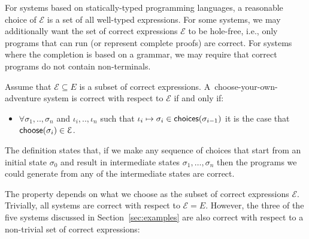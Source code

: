 \documentclass[ a4paper,UKenglish,cleveref, autoref, thm-restate]{lipics-v2021}
\newcommand{\ident}[1]{\textsf{#1}}
\newcommand{\select}{\textnormal{\ident{choose}}}
\newcommand{\choices}{\textnormal{\ident{choices}}}
\begin{document}
For systems based on statically-typed programming languages, a reasonable choice of $\mathcal{E}$
is a set of all well-typed expressions. For some systems, we may additionally want the set
of correct expressions $\mathcal{E}$ to be hole-free, i.e., only programs that can run (or
represent complete proofs) are correct. For systems where the completion is based on a grammar,
we may require that correct programs do not contain non-terminals.


\begin{definition}[Correctness]
Assume that $\mathcal{E}\subseteq E$ is a subset of correct expressions.
A~choose-your-own-adventure system is correct with respect to $\mathcal{E}$ if and only if:
\begin{itemize}
\item $\forall \sigma_1,..,\sigma_n$ and $\iota_i,..,\iota_n$ such that
  $\iota_i\mapsto\sigma_i \in \choices(\sigma_{i-1})$ it is the case
that $\select(\sigma_i) \in \mathcal{E}$.
\end{itemize}
\end{definition}

The definition states that, if we make any sequence of choices that start from an initial state
$\sigma_0$ and result in intermediate states $\sigma_1, \ldots, \sigma_n$ then the programs
we could generate from any of the intermediate states are correct.

The property depends on what we choose as the subset of correct expressions
$\mathcal{E}$. Trivially, all systems are correct with respect to $\mathcal{E}=E$.
However, the three of the five systems discussed in Section~\ref{sec:examples} are also
correct with respect to a non-trivial set of correct expressions:
\end{document}
